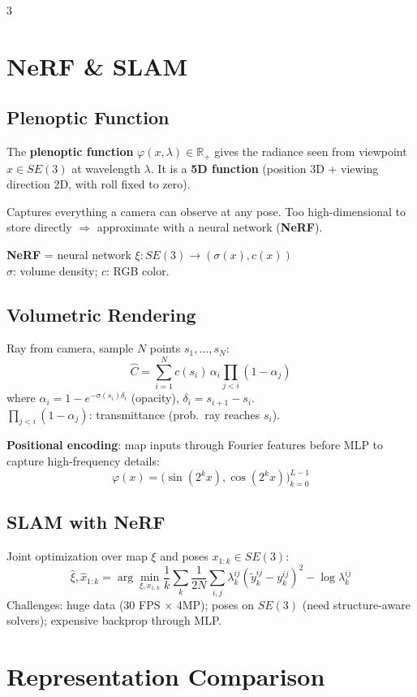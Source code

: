 \documentclass[9pt,landscape]{article}
\begin{document}
\begin{multicols}{3}
\section{NeRF \& SLAM}

\subsection{Plenoptic Function}
The \textbf{plenoptic function} $\varphi(x,\lambda)\in\mathbb{R}_+$ gives the radiance seen from viewpoint $x\in SE(3)$ at wavelength $\lambda$. It is a \textbf{5D function} (position 3D + viewing direction 2D, with roll fixed to zero).

Captures everything a camera can observe at any pose. Too high-dimensional to store directly $\Rightarrow$ approximate with a neural network (\textbf{NeRF}).

\textbf{NeRF} = neural network $\xi: SE(3)\to(\sigma(x),c(x))$\\
$\sigma$: volume density; $c$: RGB color.

\subsection{Volumetric Rendering}
Ray from camera, sample $N$ points $s_1,\ldots,s_N$:
\[\hat C=\sum_{i=1}^N c(s_i)\,\alpha_i\prod_{j<i}(1-\alpha_j)\]
where $\alpha_i=1-e^{-\sigma(s_i)\delta_i}$ (opacity), $\delta_i=s_{i+1}-s_i$.\\
$\prod_{j<i}(1-\alpha_j)$: transmittance (prob.\ ray reaches $s_i$).

\textbf{Positional encoding}: map inputs through Fourier features before MLP to capture high-frequency details:
\[\varphi(x)=\bigl(\sin(2^k x),\cos(2^k x)\bigr)_{k=0}^{L-1}\]

\subsection{SLAM with NeRF}
Joint optimization over map $\xi$ and poses $x_{1:k}\in SE(3)$:
\[\hat\xi,\hat x_{1:k}=\arg\min_{\xi,x_{1:k}}\frac{1}{k}\sum_k\frac{1}{2N}\sum_{i,j}\lambda_k^{ij}(\tilde y_k^{ij}-y_k^{ij})^2-\log\lambda_k^{ij}\]
Challenges: huge data (30 FPS $\times$ 4MP); poses on $SE(3)$ (need structure-aware solvers); expensive backprop through MLP.

\section{Representation Comparison}


\end{multicols}
\end{document}
